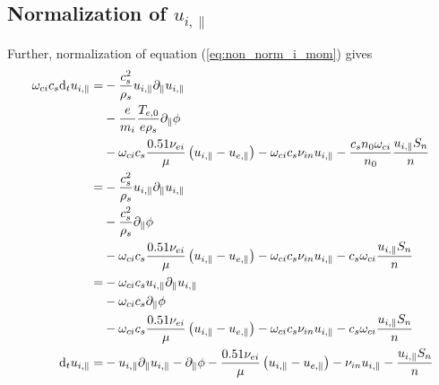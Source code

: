 \subsection{Normalization of \texorpdfstring{$u_{i,\|}$}{parallel ion momentum}}
%
Further, normalization of equation (\ref{eq:non_norm_i_mom}) gives
%
\begin{align*}
 \om_{ci} c_s
 \d_t u_{i,\|}
 =&
 - \frac{c_s^2}{\rho_s}
 u_{i,\|} \partial_\| u_{i,\|}
 \\
 &
 - \frac{e}{m_i} \frac{T_{e,0}}{e\rho_s}
 \partial_\|\phi
 \\
 &
 - \omega_{ci} c_s
 \frac{ 0.51 \nu_{ei} }{ \mu } \L(u_{i,\|}-u_{e,\|}\R)
 - \om_{ci} c_s
 \nu_{in} u_{i,\|}
 - \frac{c_s n_0 \om_{ci}}{n_0}
 \frac{u_{i,\|}S_{n}}{n}
 \\
%
%
 =&
 - \frac{c_s^2}{\rho_s}
 u_{i,\|} \partial_\| u_{i,\|}
 \\
 &
 - \frac{c_s^2}{\rho_s}
 \partial_\|\phi
 \\
 &
 - \omega_{ci} c_s
 \frac{ 0.51 \nu_{ei} }{ \mu } \L(u_{i,\|}-u_{e,\|}\R)
 - \om_{ci} c_s
 \nu_{in} u_{i,\|}
 - c_s \om_{ci}
 \frac{u_{i,\|}S_{n}}{n}
 \\
%
%
 =&
 - \omega_{ci} c_s
 u_{i,\|} \partial_\| u_{i,\|}
 \\
 &
 - \omega_{ci} c_s
 \partial_\|\phi
 \\
 &
 - \omega_{ci} c_s
 \frac{ 0.51 \nu_{ei} }{ \mu } \L(u_{i,\|}-u_{e,\|}\R)
 - \om_{ci} c_s
 \nu_{in} u_{i,\|}
 - c_s \om_{ci}
 \frac{u_{i,\|}S_{n}}{n}
 \\
%
%
 \d_t u_{i,\|}
 =&
 - u_{i,\|} \partial_\| u_{i,\|}
 - \partial_\|\phi
 - \frac{ 0.51 \nu_{ei} }{ \mu } \L(u_{i,\|}-u_{e,\|}\R)
 - \nu_{in} u_{i,\|}
 - \frac{u_{i,\|}S_{n}}{n}
\end{align*}
